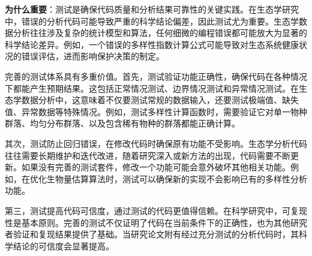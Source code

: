 \documentclass[
  twoside]{book}
\newenvironment{Shaded}{\begin{snugshade}}{\end{snugshade}}
\newcommand{\AttributeTok}[1]{\textcolor[rgb]{0.13,0.29,0.53}{#1}}
\newcommand{\CommentTok}[1]{\textcolor[rgb]{0.56,0.35,0.01}{\textit{#1}}}
\newcommand{\ConstantTok}[1]{\textcolor[rgb]{0.56,0.35,0.01}{#1}}
\newcommand{\ControlFlowTok}[1]{\textcolor[rgb]{0.13,0.29,0.53}{\textbf{#1}}}
\newcommand{\DecValTok}[1]{\textcolor[rgb]{0.00,0.00,0.81}{#1}}
\newcommand{\FunctionTok}[1]{\textcolor[rgb]{0.13,0.29,0.53}{\textbf{#1}}}
\newcommand{\NormalTok}[1]{#1}
\newcommand{\OtherTok}[1]{\textcolor[rgb]{0.56,0.35,0.01}{#1}}
\newcommand{\SpecialCharTok}[1]{\textcolor[rgb]{0.81,0.36,0.00}{\textbf{#1}}}
\newcommand{\StringTok}[1]{\textcolor[rgb]{0.31,0.60,0.02}{#1}}
\begin{document}
\begin{Shaded}
\end{Shaded}

\textbf{为什么重要}：测试是确保代码质量和分析结果可靠性的关键实践。在生态学研究中，错误的分析代码可能导致严重的科学结论偏差，因此测试尤为重要。生态学数据分析往往涉及复杂的统计模型和算法，任何细微的编程错误都可能放大为显著的科学结论差异。例如，一个错误的多样性指数计算公式可能导致对生态系统健康状况的错误评估，进而影响保护决策的制定。

完善的测试体系具有多重价值。首先，测试验证功能正确性，确保代码在各种情况下都能产生预期结果。这包括正常情况测试、边界情况测试和异常情况测试。在生态学数据分析中，这意味着不仅要测试常规的数据输入，还要测试极端值、缺失值、异常数据等特殊情况。例如，测试多样性计算函数时，需要验证它对单一物种群落、均匀分布群落、以及包含稀有物种的群落都能正确计算。

其次，测试防止回归错误，在修改代码时确保原有功能不受影响。生态学分析代码往往需要长期维护和迭代改进，随着研究深入或新方法的出现，代码需要不断更新。如果没有完善的测试套件，修改一个功能可能会意外破坏其他相关功能。例如，在优化生物量估算算法时，测试可以确保新的实现不会影响已有的多样性分析功能。

第三，测试提高代码可信度，通过测试的代码更值得信赖。在科学研究中，可复现性是基本原则。完善的测试不仅证明了代码在当前条件下的正确性，也为其他研究者验证和复现结果提供了基础。当研究论文附有经过充分测试的分析代码时，其科学结论的可信度会显著提高。
\end{document}
